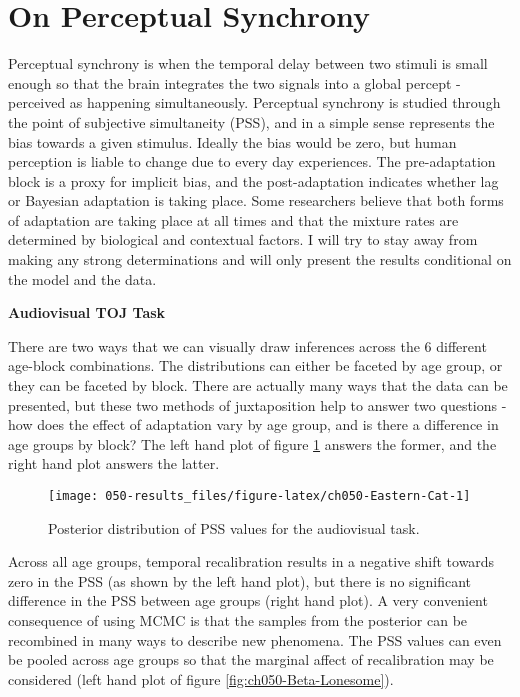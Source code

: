 \documentclass[11pt, oneside, openany]{scrbook}
\begin{document}
\hypertarget{on-perceptual-synchrony}{%
\section{On Perceptual Synchrony}\label{on-perceptual-synchrony}}

Perceptual synchrony is when the temporal delay between two stimuli is small enough so that the brain integrates the two signals into a global percept - perceived as happening simultaneously. Perceptual synchrony is studied through the point of subjective simultaneity (PSS), and in a simple sense represents the bias towards a given stimulus. Ideally the bias would be zero, but human perception is liable to change due to every day experiences. The pre-adaptation block is a proxy for implicit bias, and the post-adaptation indicates whether lag or Bayesian adaptation is taking place. Some researchers believe that both forms of adaptation are taking place at all times and that the mixture rates are determined by biological and contextual factors. I will try to stay away from making any strong determinations and will only present the results conditional on the model and the data.

\textbf{Audiovisual TOJ Task}

There are two ways that we can visually draw inferences across the 6 different age-block combinations. The distributions can either be faceted by age group, or they can be faceted by block. There are actually many ways that the data can be presented, but these two methods of juxtaposition help to answer two questions - how does the effect of adaptation vary by age group, and is there a difference in age groups by block? The left hand plot of figure \ref{fig:ch050-Eastern-Cat} answers the former, and the right hand plot answers the latter.

\begin{figure}

{\centering \texttt{[image: 050-results\_files/figure-latex/ch050-Eastern-Cat-1]} 

}

\caption{Posterior distribution of PSS values for the audiovisual task.}\label{fig:ch050-Eastern-Cat}
\end{figure}

Across all age groups, temporal recalibration results in a negative shift towards zero in the PSS (as shown by the left hand plot), but there is no significant difference in the PSS between age groups (right hand plot). A very convenient consequence of using MCMC is that the samples from the posterior can be recombined in many ways to describe new phenomena. The PSS values can even be pooled across age groups so that the marginal affect of recalibration may be considered (left hand plot of figure \ref{fig:ch050-Beta-Lonesome}).
\end{document}
